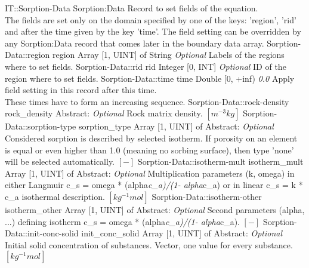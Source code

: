 \begin{RecordType}
	{IT::Sorption-Data}
	{Sorption:Data}
	{} %
	{} %
	{{{Record to set fields of the equation.}\\{
The fields are set only on the domain specified by one of the keys: 'region', 'rid'}\\{
and after the time given by the key 'time'. The field setting can be overridden by}\\{
 any Sorption:Data record that comes later in the boundary data array.}}}
		\RecKey
			{Sorption-Data::region}
			{region}
			{{Array [1, UINT] of }{String}}
			{ \it{Optional} }
			{{{Labels of the regions where to set fields. }}}
		\RecKey
			{Sorption-Data::rid}
			{rid}
			{{Integer [0, INT]}}
			{ \it{Optional} }
			{{{ID of the region where to set fields.}}}
		\RecKey
			{Sorption-Data::time}
			{time}
			{{Double [0, +inf)}}
			{ \it{0.0} }
			{{{Apply field setting in this record after this time.}\\{
These times have to form an increasing sequence.}}}
		\RecKey
			{Sorption-Data::rock-density}
			{rock{\_}density}
			{{Abstract}{: }}
			{ \it{Optional} }
			{{{Rock matrix density. }{$[m^{-3}kg]$}}}
		\RecKey
			{Sorption-Data::sorption-type}
			{sorption{\_}type}
			{{Array [1, UINT] of }{Abstract}{: }}
			{ \it{Optional} }
			{{{Considered sorption is described by selected isotherm. If porosity on an element is equal or even higher than 1.0 (meaning no sorbing surface), then type 'none' will be selected automatically. }{$[-]$}}}
		\RecKey
			{Sorption-Data::isotherm-mult}
			{isotherm{\_}mult}
			{{Array [1, UINT] of }{Abstract}{: }}
			{ \it{Optional} }
			{{{Multiplication parameters (k, omega) in either Langmuir c{\_}s = omega * (alpha}\textit{c{\_}a)/(1- alpha}{c{\_}a) or in linear c{\_}s = k * c{\_}a isothermal description. }{$[kg^{-1}mol]$}}}
		\RecKey
			{Sorption-Data::isotherm-other}
			{isotherm{\_}other}
			{{Array [1, UINT] of }{Abstract}{: }}
			{ \it{Optional} }
			{{{Second parameters (alpha, ...) defining isotherm  c{\_}s = omega * (alpha}\textit{c{\_}a)/(1- alpha}{c{\_}a). }{$[-]$}}}
		\RecKey
			{Sorption-Data::init-conc-solid}
			{init{\_}conc{\_}solid}
			{{Array [1, UINT] of }{Abstract}{: }}
			{ \it{Optional} }
			{{{Initial solid concentration of substances. Vector, one value for every substance. }{$[kg^{-1}mol]$}}}
\end{RecordType}
